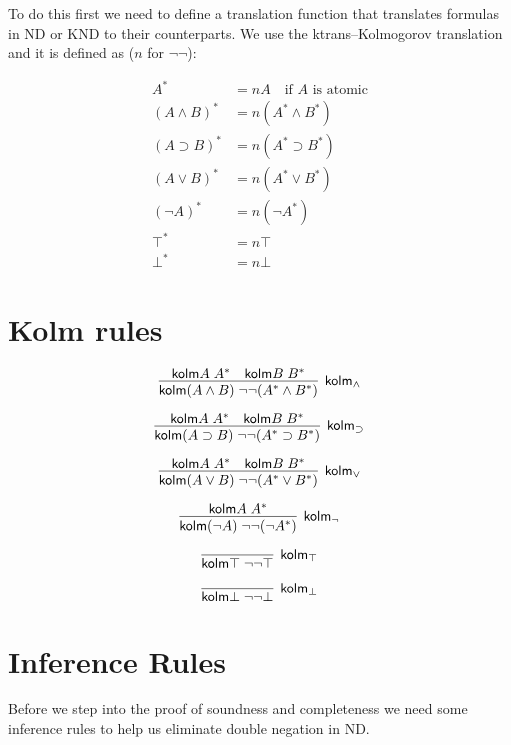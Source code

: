 \documentclass{article}
\begin{document}
To do this first we need to define a translation function that translates formulas in ND or KND to their counterparts. We use the ktrans--Kolmogorov translation and it is defined as ($n$ for $\neg\neg$):

\begin{align*}
A^* &= nA \quad \text{if } A \text{ is atomic} \\
(A \land B)^* &= n(A^* \land B^*) \\
(A \supset B)^* &= n(A^* \supset B^*) \\
(A \lor B)^* &= n(A^* \lor B^*) \\
(\neg A)^* &= n(\neg A^*) \\
\top^* &= n\top \\
\bot^* &= n\bot
\end{align*}


\section{Kolm rules}

\newcommand{\kolm}{\mathsf{kolm}}   %
\newcommand{\nneg}{\neg\neg}        %

\[
\infer[\kolm_{\land}]
  {\kolm (A \land B)\; \nneg (A^{*} \land B^{*})}
  {
    \kolm A\; A^{*}
    &
    \kolm B\; B^{*}
  }
\]

\[
\infer[\kolm_{\supset}]
  {\kolm (A \supset B)\; \nneg (A^{*} \supset B^{*})}
  {
    \kolm A\; A^{*}
    &
    \kolm B\; B^{*}
  }
\]

\[
\infer[\kolm_{\lor}]
  {\kolm (A \lor B)\; \nneg (A^{*} \lor B^{*})}
  {
    \kolm A\; A^{*}
    &
    \kolm B\; B^{*}
  }
\]

\[
\infer[\kolm_{\neg}]
  {\kolm (\neg A)\; \nneg (\neg A^{*})}
  {
    \kolm A\; A^{*}
  }
\]

\[
\infer[\kolm_{\top}]
  {\kolm \top\; \nneg \top}
  {}
\]

\[
\infer[\kolm_{\bot}]
  {\kolm \bot\; \nneg \bot}
  {}
\]

\section{Inference Rules}
Before we step into the proof of soundness and completeness we need some 
inference rules to help us eliminate double negation in ND.
\end{document}
